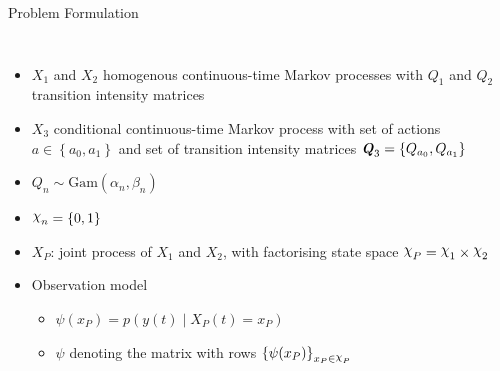 \documentclass[
	english,%
	aspectratio=169,%
	color={accentcolor=3b},
	logo=true,%
	colorframetitle=false,%
	]{tudabeamer}
\DeclareRobustCommand{\rchi}{{\mathpalette\irchi\relax}}
\newcommand{\irchi}[2]{\raisebox{\depth}{$#1\chi$}}
\begin{document}
\begin{frame}{Problem Formulation}
\begin{columns}[onlytextwidth,c]
{
	}
	\begin{itemize}
		\item $ X_{1} $ and $ X_{2} $ homogenous continuous-time Markov processes with $ Q_{1} $ and $ Q_{2} $ transition intensity matrices
		\item $X_{3} $ conditional continuous-time Markov process  with set of actions $ a \in \left\lbrace a_{0}, a_{1}\right\rbrace  $ and set of transition intensity matrices $ \textbf{\textit{Q}}_{3} = \left\lbrace Q_{a_{0}}, Q_{a_{1}} \right\rbrace  $
		\item $ Q_{n} \sim \mathrm{Gam}(\alpha_{n}, \beta_{n}) $
		\item $ \rchi_{n} = \left\lbrace 0,1\right\rbrace $
		\item $ X_P $: joint process of $ X_1 $ and $ X_2 $, with factorising state space $ \rchi_{P} = \rchi_1 \times \rchi_2 $
		\item Observation model
		\begin{itemize}
			\item $ \psi(x_P) = p(y(t) \mid X_{P}(t)=x_P) $
			\vspace{5pt}
			\item $ \psi $ denoting the matrix with rows $ \left\lbrace \psi(x_P)\right\rbrace_{x_P \in \rchi_P} $
		\end{itemize}
	\end{itemize}
\end{columns}
\end{frame}
\end{document}

